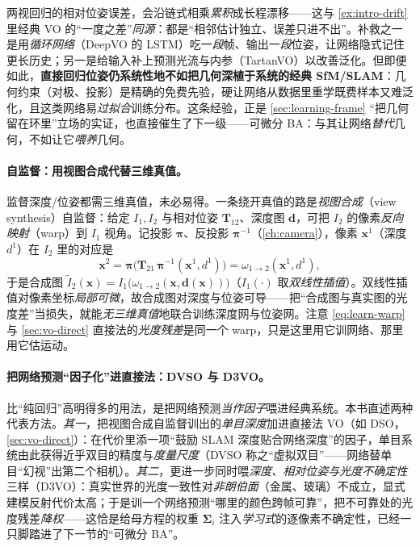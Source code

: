 \begin{insight}
两视回归的相对位姿误差，会沿链式相乘\emph{累积}成长程漂移——这与 \cref{ex:intro-drift} 里经典 VO 的“一度之差”\emph{同源}：都是“相邻估计独立、误差只进不出”。补救之一是用\emph{循环网络}（DeepVO 的 LSTM）吃一\emph{段}帧、输出一\emph{段}位姿，让网络隐式记住更长历史；另一是给输入补上预测光流与内参（TartanVO）以改善泛化。但即便如此，\textbf{直接回归位姿仍系统性地不如把几何深植于系统的经典 SfM/SLAM}\cite{teed2026boosting}：几何约束（对极、投影）是精确的免费先验，硬让网络从数据里重学既费样本又难泛化，且这类网络易\emph{过拟合}训练分布。这条经验，正是 \cref{sec:learning-frame} “把几何留在环里”立场的实证，也直接催生了下一级——可微分 BA：与其让网络\emph{替代}几何，不如让它\emph{喂养}几何。
\end{insight}

\paragraph{自监督：用视图合成代替三维真值。}
监督深度/位姿都需三维真值，未必易得。一条绕开真值的路是\emph{视图合成}（view synthesis）自监督\cite{godard2017unsupervised,zhou2017unsupervised}：给定 $I_1,I_2$ 与相对位姿 $\mathbf{T}_{12}$、深度图 $\mathbf{d}$，可把 $I_2$ 的像素\emph{反向映射}（warp）到 $I_1$ 视角。记投影 $\boldsymbol\pi$、反投影 $\boldsymbol\pi^{-1}$（\cref{ch:camera}），像素 $\mathbf{x}^1$（深度 $d^1$）在 $I_2$ 里的对应是
\begin{equation}
  \mathbf{x}^2=\boldsymbol\pi\!\big(\mathbf{T}_{21}\,\boldsymbol\pi^{-1}(\mathbf{x}^1,d^1)\big)
  =\omega_{1\to2}(\mathbf{x}^1,d^1),
  \label{eq:learn-warp}
\end{equation}
于是合成图 $\tilde I_2(\mathbf{x})=I_1\big(\omega_{1\to2}(\mathbf{x},\mathbf{d}(\mathbf{x}))\big)$（$I_1(\cdot)$ 取\emph{双线性插值}）。双线性插值对像素坐标\emph{局部可微}，故合成图对深度与位姿可导——把“合成图与真实图的光度差”当损失，就能\emph{无三维真值}地联合训练深度网与位姿网。注意 \cref{eq:learn-warp} 与 \cref{sec:vo-direct} 直接法的\emph{光度残差}是同一个 warp，只是这里用它训网络、那里用它估运动。

\paragraph{把网络预测“因子化”进直接法：DVSO 与 D3VO。}
比“纯回归”高明得多的用法，是把网络预测\emph{当作因子}喂进经典系统。本书直述两种代表方法。\emph{其一}，把视图合成自监督训出的\emph{单目深度}加进直接法 VO（如 DSO，\cref{sec:vo-direct}）：在代价里添一项“鼓励 SLAM 深度贴合网络深度”的因子，单目系统由此获得近乎双目的精度与\emph{度量尺度}（DVSO 称之“虚拟双目”——网络替单目“幻视”出第二个相机）\cite{yang2018dvso}。\emph{其二}，更进一步同时喂\emph{深度、相对位姿与光度不确定性}三样（D3VO\cite{yang2020d3vo}）：真实世界的光度一致性对\emph{非朗伯面}（金属、玻璃）不成立，显式建模反射代价太高；于是训一个网络预测“哪里的颜色跨帧可靠”，把不可靠处的光度残差\emph{降权}——这恰是给母方程的权重 $\boldsymbol\Sigma_i$ 注入\emph{学习式}的逐像素不确定性，已经一只脚踏进了下一节的“可微分 BA”。

